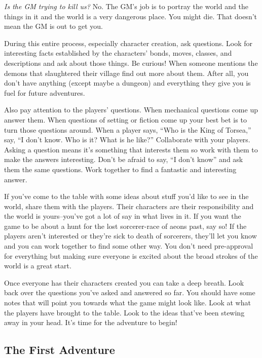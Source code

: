 \emph{Is the GM trying to kill us?}
No. The GM's job is to portray the world and the things in it and the world is a very dangerous place. You might die. That doesn't mean the GM is out to get you.


During this entire process, especially character creation, ask questions. Look for interesting facts established by the characters' bonds, moves, classes, and descriptions and ask about those things. Be curious! When someone mentions the demons that slaughtered their village find out more about them. After all, you don't have anything (except maybe a dungeon) and everything they give you is fuel for future adventures.


Also pay attention to the players' questions. When mechanical questions come up answer them. When questions of setting or fiction come up your best bet is to turn those questions around. When a player says, ``Who is the King of Torsea,'' say, ``I don't know. Who is it? What is he like?'' Collaborate with your players. Asking a question means it's something that interests them so work with them to make the answers interesting. Don't be afraid to say, ``I don't know'' and ask them the same questions. Work together to find a fantastic and interesting answer.


If you've come to the table with some ideas about stuff you'd like to see in the world, share them with the players. Their characters are their responsibility and the world is yours--you've got a lot of say in what lives in it. If you want the game to be about a hunt for the lost sorcerer-race of aeons past, say so! If the players aren't interested or they're sick to death of sorcerers, they'll let you know and you can work together to find some other way. You don't need pre-approval for everything but making sure everyone is excited about the broad strokes of the world is a great start.


Once everyone has their characters created you can take a deep breath. Look back over the questions you've asked and answered so far. You should have some notes that will point you towards what the game might look like. Look at what the players have brought to the table. Look to the ideas that've been stewing away in your head. It's time for the adventure to begin!
\subsection{The First Adventure}


